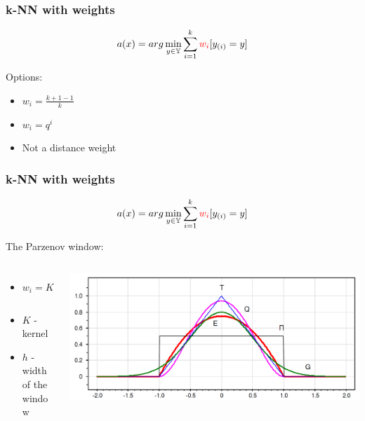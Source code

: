 \documentclass[default]{beamer}
\begin{document}
	\begin{frame}
		\frametitle{k-NN with weights}
		\[
			a(x)=arg\min_{y\in\mathbb Y}\sum_{i=1}^k\textcolor{red}{w_i}[y_{(i)}=y]
		\]
		
		Options:
		\begin{itemize}
			\item $w_i=\frac{k+1-1}{k}$
			\item $w_i=q^i$
			\item Not a distance weight
		\end{itemize}
	\end{frame}

	\begin{frame}
		\frametitle{k-NN with weights}
		\[
		a(x)=arg\min_{y\in\mathbb Y}\sum_{i=1}^k\textcolor{red}{w_i}[y_{(i)}=y]
		\]
		
		The Parzenov window:
		\begin{columns}
			\begin{column}{0.5\textwidth}
				\begin{itemize}
					\item $w_i=K(\frac{\rho(x,x_{(i)})}{h})$
					\item $K$ - kernel
					\item $h$ - width of the window
				\end{itemize}
				
			\end{column}
			\begin{column}{0.5\textwidth}
				\centering
				\includegraphics[width=\textwidth]{linear_5.png}
			\end{column}
		\end{columns}
	\end{frame}
\end{document}
